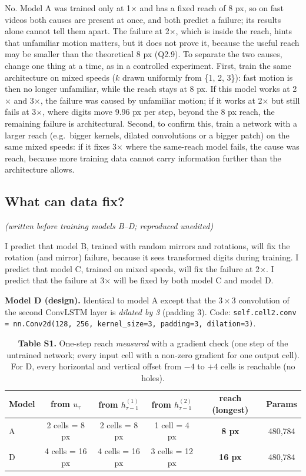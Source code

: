 No. Model A was trained only at 1$\times$ and has a fixed reach of 8 px, so on fast videos both causes are present at once, and both predict a failure; its results alone cannot tell them apart. The failure at 2$\times$, which is inside the reach, hints that unfamiliar motion matters, but it does not prove it, because the useful reach may be smaller than the theoretical 8 px (Q2.9). To separate the two causes, change one thing at a time, as in a controlled experiment. First, train the same architecture on mixed speeds ($k$ drawn uniformly from \{1, 2, 3\}): fast motion is then no longer unfamiliar, while the reach stays at 8 px. If this model works at 2$\times$ and 3$\times$, the failure was caused by unfamiliar motion; if it works at 2$\times$ but still fails at 3$\times$, where digits move 9.96 px per step, beyond the 8 px reach, the remaining failure is architectural. Second, to confirm this, train a network with a larger reach (e.g.\ bigger kernels, dilated convolutions or a bigger patch) on the same mixed speeds: if it fixes 3$\times$ where the same-reach model fails, the cause was reach, because more training data cannot carry information further than the architecture allows.

\subsection{What can data fix?}

 \emph{(written before training models B--D; reproduced unedited)}

I predict that model B, trained with random mirrors and rotations, will fix the rotation (and mirror) failure, because it sees transformed digits during training. I predict that model C, trained on mixed speeds, will fix the failure at 2$\times$. I predict that the failure at 3$\times$ will be fixed by both model C and model D.

\textbf{Model D (design).} Identical to model A except that the $3\times3$ convolution of the second ConvLSTM layer is \emph{dilated by 3} (padding 3). Code:
\texttt{self.cell2.conv = nn.Conv2d(128, 256, kernel\_size=3, padding=3, dilation=3)}.

\begin{table}[H]
\centering\small
\begin{tabular}{@{}lccccc@{}}
\toprule
\textbf{Model} & \textbf{from $u_\tau$} & \textbf{from $h^{(1)}_{\tau-1}$} & \textbf{from $h^{(2)}_{\tau-1}$} & \textbf{reach (longest)} & \textbf{Params}\\
\midrule
A & 2 cells = 8 px & 2 cells = 8 px & 1 cell = 4 px & \textbf{8 px} & 480,784\\
D & 4 cells = 16 px & 4 cells = 16 px & 3 cells = 12 px & \textbf{16 px} & 480,784\\
\bottomrule
\end{tabular}
\caption*{\textbf{Table S1.} One-step reach \emph{measured} with a gradient check (one step of the untrained network; every input cell with a non-zero gradient for one output cell). For D, every horizontal and vertical offset from $-4$ to $+4$ cells is reachable (no holes).}
\end{table}

